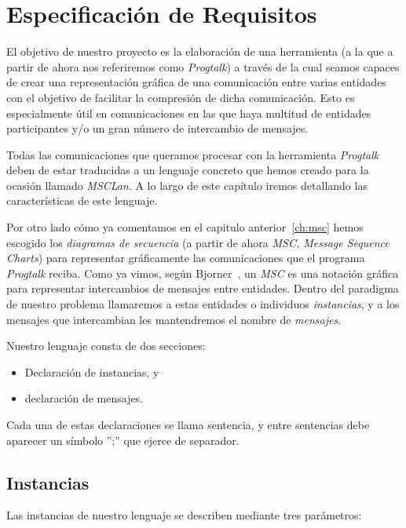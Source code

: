 \chapter{Especificación de Requisitos}
\label{ch:requisitos}

El objetivo de nuestro proyecto es la elaboración de una herramienta
(a la que a partir de ahora nos referiremos como \textit{Progtalk}) a
través de la cual seamos capaces de crear una representación gráfica
de una comunicación entre varias entidades con el objetivo de
facilitar la compresión de dicha comunicación. Esto es especialmente
útil en comunicaciones en las que haya multitud de entidades
participantes y/o un gran número de intercambio de mensajes.

Todas las comunicaciones que queramos procesar con la herramienta
\textit{Progtalk} deben de estar traducidas a un lenguaje concreto que
hemos creado para la ocasión llamado \textit{MSCLan}. A lo largo de
este capítulo iremos detallando las características de este lenguaje.

Por otro lado cómo ya comentamos en el capitulo anterior~\ref{ch:msc}
hemos escogido los \textit{diagramas de secuencia} (a partir de ahora
\textit{MSC, Message Sequence Charts}) para representar gráficamente
las comunicaciones que el programa \textit{Progtalk} reciba. Como ya
vimos, según Bjorner~\cite{Bjorner}, un \textit{MSC} es una notación
gráfica para representar intercambios de mensajes entre
entidades. Dentro del paradigma de nuestro problema llamaremos a estas
entidades o individuos \textit{instancias}, y a los mensajes que
intercambian les mantendremos el nombre de \textit{mensajes}.

Nuestro lenguaje consta de dos secciones:
\begin{itemize}
\item Declaración de instancias, y
\item declaración de mensajes.
\end{itemize}

Cada una de estas declaraciones se llama sentencia, y entre sentencias
debe aparecer un símbolo '';'' que ejerce de separador.

\section{Instancias}\label{sec:Instancias}

Las instancias de nuestro lenguaje se describen mediante tres
parámetros:

